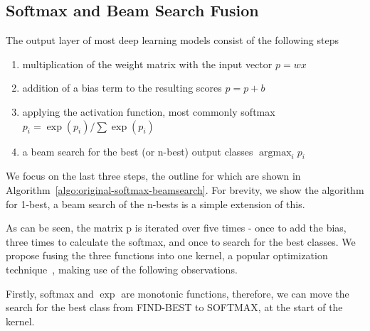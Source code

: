 \documentclass[11pt,a4paper]{article}
\DeclareMathOperator*{\argmax}{argmax}
\begin{document}
\subsection{Softmax and Beam Search Fusion}

The output layer of most deep learning models consist of the following steps
\begin{enumerate}
   \item \vspace{-3 mm} multiplication of the weight matrix with the input vector $p = w x$
   \item \vspace{-3 mm} addition of a bias term to the resulting scores $p = p + b$
   \item \vspace{-3 mm} applying the activation function, most commonly softmax $ p_i = \exp(p_i) / \sum \exp(p_i) $
   \item \vspace{-3 mm} a beam search for the best (or n-best) output classes $\argmax_i p_i$
\end{enumerate}

We focus on the last three steps, the outline for which are shown in Algorithm~\ref{algo:original-softmax-beamsearch}. For brevity, we show the algorithm for 1-best, a beam search of the n-bests is a simple extension of this.

As can be seen, the matrix p is iterated over five times - once to add the bias, three times to calculate the softmax, and once to search for the best classes. We propose fusing the three functions into one kernel, a popular optimization technique~\citep{Guevara2009EnablingTP}, making use of the following observations.

Firstly, softmax and $\exp$ are monotonic functions, therefore, we can move the search for the best class from FIND-BEST to SOFTMAX, at the start of the kernel.
\end{document}
